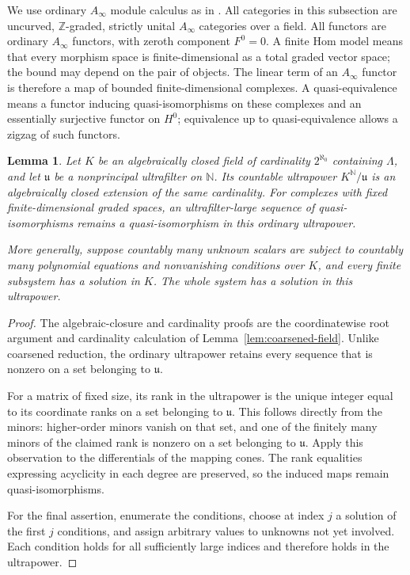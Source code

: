 \documentclass[11pt]{article}
\numberwithin{equation}{section}
\newtheorem{lemma}[theorem]{Lemma}
\theoremstyle{definition}
\theoremstyle{remark}
\begin{document}
We use ordinary $A_\infty$ module calculus as in
\cite{HMS:Keller,HMS:SeidelBook}.  All categories in this subsection are uncurved, $\mathbb Z$-graded,
strictly unital $A_\infty$ categories over a field.  All functors are
ordinary $A_\infty$ functors, with zeroth component $F^0=0$.
A finite Hom model
means that every morphism space is finite-dimensional as a total graded
vector space; the bound may depend on the pair of objects.  The linear
term of an $A_\infty$ functor is therefore a map of bounded finite-dimensional
complexes.  A quasi-equivalence means a functor inducing quasi-isomorphisms
on these complexes and an essentially surjective functor on $H^0$;
equivalence up to quasi-equivalence allows a zigzag of such functors.

\begin{lemma}\label{lem:field-ordinary-ultrapower}
Let $K$ be an algebraically closed field of cardinality
$2^{\aleph_0}$ containing $\Lambda$, and let $\mathfrak u$ be
a nonprincipal ultrafilter on $\mathbb N$.  Its countable ultrapower
$K^{\mathbb N}/\mathfrak u$ is an algebraically closed extension of the same
cardinality.  For complexes with fixed finite-dimensional graded
spaces, an ultrafilter-large sequence of quasi-isomorphisms remains
a quasi-isomorphism in this ordinary ultrapower.

More generally, suppose countably many unknown scalars are subject
to countably many polynomial equations and nonvanishing conditions
over $K$, and every finite subsystem has a solution in $K$.  The
whole system has a solution in this ultrapower.
\end{lemma}

\begin{proof}
The algebraic-closure and cardinality proofs are the coordinatewise
root argument and cardinality calculation of
Lemma~\ref{lem:coarsened-field}.  Unlike coarsened reduction, the ordinary
ultrapower retains every sequence that is nonzero on a set belonging
to $\mathfrak u$.

For a matrix of fixed size, its rank in the ultrapower is the unique
integer equal to its coordinate ranks on a set belonging to
$\mathfrak u$.  This follows directly from the minors: higher-order
minors vanish on that set, and one of the finitely many minors of the
claimed rank is nonzero on a set belonging to $\mathfrak u$.  Apply
this observation to the differentials of the mapping cones.  The
rank equalities expressing acyclicity in each degree are preserved,
so the induced maps remain quasi-isomorphisms.

For the final assertion, enumerate the conditions, choose at index
$j$ a solution of the first $j$ conditions, and assign arbitrary
values to unknowns not yet involved.  Each condition holds for all
sufficiently large indices and therefore holds in the ultrapower.
\end{proof}
\end{document}
